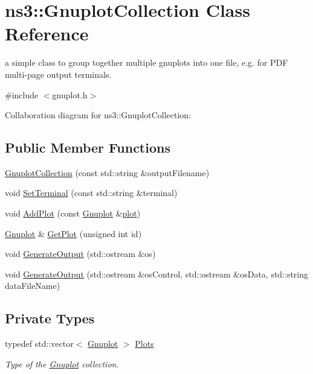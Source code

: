 \hypertarget{classns3_1_1GnuplotCollection}{}\section{ns3\+:\+:Gnuplot\+Collection Class Reference}
\label{classns3_1_1GnuplotCollection}


a simple class to group together multiple gnuplots into one file, e.\+g. for P\+DF multi-\/page output terminals.  




{\ttfamily \#include $<$gnuplot.\+h$>$}



Collaboration diagram for ns3\+:\+:Gnuplot\+Collection\+:
\subsection*{Public Member Functions}
\begin{DoxyCompactItemize}
\item 
\hyperlink{classns3_1_1GnuplotCollection_a053527c410fbfb8f4e8e113b242ff3b2}{Gnuplot\+Collection} (const std\+::string \&output\+Filename)
\item 
void \hyperlink{classns3_1_1GnuplotCollection_a0b475d539807fc111216c0169fcc8e3c}{Set\+Terminal} (const std\+::string \&terminal)
\item 
void \hyperlink{classns3_1_1GnuplotCollection_a0629370e2975c911e54f170264fc0351}{Add\+Plot} (const \hyperlink{classns3_1_1Gnuplot}{Gnuplot} \&\hyperlink{lte__ue__measurements_8m_abc8556731d7e8b636d27b7212ae8f08d}{plot})
\item 
\hyperlink{classns3_1_1Gnuplot}{Gnuplot} \& \hyperlink{classns3_1_1GnuplotCollection_a6e684cdd6db9b8a38398fe6a7b29eea8}{Get\+Plot} (unsigned int id)
\item 
void \hyperlink{classns3_1_1GnuplotCollection_abe576465769dbf79a6f2b03c864f8e6f}{Generate\+Output} (std\+::ostream \&os)
\item 
void \hyperlink{classns3_1_1GnuplotCollection_a6f3a0f29747271a87b199bc2d8049f5a}{Generate\+Output} (std\+::ostream \&os\+Control, std\+::ostream \&os\+Data, std\+::string data\+File\+Name)
\end{DoxyCompactItemize}
\subsection*{Private Types}
\begin{DoxyCompactItemize}
\item 
typedef std\+::vector$<$ \hyperlink{classns3_1_1Gnuplot}{Gnuplot} $>$ \hyperlink{classns3_1_1GnuplotCollection_ac5dafa4a42829b1a88be9b21cb770544}{Plots}
\begin{DoxyCompactList}\small\item\em Type of the \hyperlink{classns3_1_1Gnuplot}{Gnuplot} collection. \end{DoxyCompactList}\end{DoxyCompactItemize}
